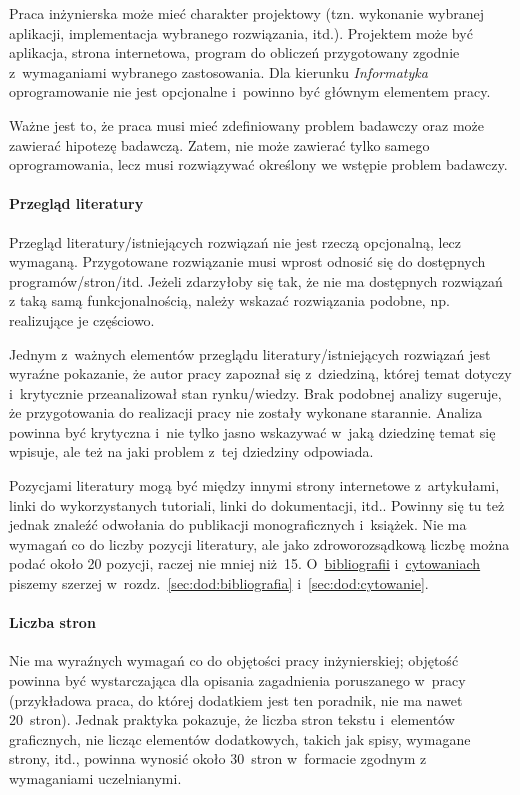 Praca inżynierska może mieć charakter projektowy (tzn. wykonanie wybranej aplikacji, 
implementacja wybranego rozwiązania, itd.). Projektem może być aplikacja, strona 
internetowa, program do obliczeń przygotowany zgodnie z~wymaganiami wybranego 
zastosowania. Dla kierunku {\em Informatyka} oprogramowanie nie jest opcjonalne i~powinno być głównym elementem pracy. 

Ważne jest to, że praca musi mieć zdefiniowany problem badawczy oraz może zawierać hipotezę badawczą. Zatem, nie może zawierać tylko samego oprogramowania, lecz musi rozwiązywać określony we wstępie problem badawczy.


\paragraph{Przegląd literatury}
\label{sec:dod:przeglad-literatury-inzynierska}
Przegląd literatury/istniejących rozwiązań nie jest rzeczą opcjonalną, lecz wymaganą. 
Przygotowane rozwiązanie musi wprost odnosić się do dostępnych 
programów/stron/itd. Jeżeli zdarzyłoby się tak, że nie ma dostępnych rozwiązań z taką 
samą funkcjonalnością, należy wskazać rozwiązania podobne, np. realizujące je 
częściowo. 

Jednym z~ważnych elementów przeglądu literatury/istniejących rozwiązań jest wyraźne pokazanie, że autor pracy zapoznał się z~dziedziną, której temat dotyczy i~krytycznie przeanalizował stan rynku/wiedzy. Brak podobnej analizy sugeruje, że przygotowania do realizacji pracy nie zostały wykonane starannie. Analiza powinna być krytyczna i~nie tylko jasno wskazywać w~jaką dziedzinę temat się wpisuje, ale też na jaki problem z~tej dziedziny odpowiada.

Pozycjami literatury mogą być między innymi strony 
internetowe z~artykułami, linki do wykorzystanych tutoriali, linki do dokumentacji, 
itd.. Powinny się tu też jednak znaleźć odwołania do publikacji monograficznych i~książek. Nie ma wymagań co do liczby pozycji literatury, ale jako zdroworozsądkową liczbę można podać około 20 pozycji, raczej nie mniej niż~15. O~\hyperref[sec:dod:bibliografia]{bibliografii} i~\hyperref[sec:dod:cytowanie]{cytowaniach} piszemy szerzej w~rozdz.~\ref{sec:dod:bibliografia} i~\ref{sec:dod:cytowanie}. 


\paragraph{Liczba stron}
\label{sec:dod:liczba-stron-inzynierskiej}
Nie ma wyraźnych wymagań co do objętości pracy inżynierskiej; objętość powinna być wystarczająca dla opisania zagadnienia poruszanego w~pracy (przykładowa praca, do której dodatkiem jest ten poradnik, nie ma nawet 20~stron). Jednak praktyka pokazuje, że liczba stron tekstu i~elementów graficznych, nie licząc elementów dodatkowych, takich jak spisy, wymagane strony, itd., powinna wynosić około 30~stron w~formacie 
zgodnym z wymaganiami uczelnianymi.


